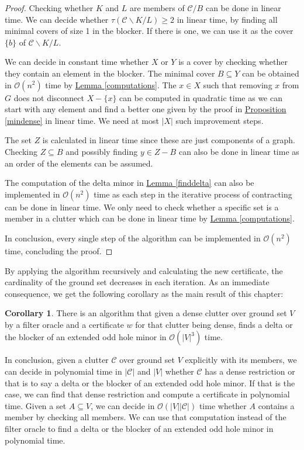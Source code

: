 \documentclass[a4paper, 12pt, twoside=false]{scrbook}
\theoremstyle{definition}
\newtheorem{corollary}[theorem]{Corollary}
\begin{document}
\begin{proof}
       Checking whether $K$ and $L$ are members of $\mathcal{C}/B$ can be done in linear time.
       We can decide whether $\tau(\mathcal{C}\backslash K / L)\geq 2$ in linear time, by finding all minimal covers of size 1 in the blocker. If there is one, we can use it as the cover $\{b\}$ of $\mathcal{C}\backslash K / L$.

       We can decide in constant time whether $X$ or $Y$ is a cover by checking whether they contain an element in the blocker.
       The minimal cover $B \subseteq Y$ can be obtained in $\mathcal{O}(n^2)$ time by \hyperref[computations]{Lemma \ref*{computations}}.
       The $x \in X$ such that removing $x$ from $G$ does not disconnect $X - \{x\}$ can be computed in quadratic time as we can start with any element and find a better one given by the proof in \hyperref[mindense]{Proposition \ref*{mindense}} in linear time. We need at most $|X|$ such improvement steps.

       The set $Z$ is calculated in linear time since these are just components of a graph.
       Checking $Z \subseteq B$ and possibly finding $y \in Z-B$ can also be done in linear time as an order of the elements can be assumed.

       The computation of the delta minor in \hyperref[finddelta]{Lemma \ref*{finddelta}} can also be implemented in $\mathcal{O}(n^2)$ time as each step in the iterative process of contracting can be done in linear time. We only need to check whether a specific set is a member in a clutter which can be done in linear time by \hyperref[computations]{Lemma \ref*{computations}}.

       In conclusion, every single step of the algorithm can be implemented in $\mathcal{O}(n^2)$ time, concluding the proof.
   \end{proof}

   By applying the algorithm recursively and calculating the new certificate, the cardinality of the ground set decreases in each iteration. As an immediate consequence, we get the following corollary as the main result of this chapter:

   \begin{corollary}
       There is an algorithm that given a dense clutter over ground set $V$ by a filter oracle and a certificate $w$ for that clutter being dense, finds a delta or the blocker of an extended odd hole minor in $\mathcal{O}(|V|^3)$ time.
   \end{corollary}

   In conclusion, given a clutter $\mathcal{C}$ over ground set $V$ explicitly with its members, we can decide in polynomial time in $|\mathcal{C}|$ and $|V|$ whether $\mathcal{C}$ has a dense restriction or that is to say a delta or the blocker of an extended odd hole minor.
   If that is the case, we can find that dense restriction and compute a certificate in polynomial time.
   Given a set $A \subseteq V$, we can decide in $\mathcal{O}(|V||\mathcal{C}|)$ time whether $A$ contains a member by checking all members. We can use that computation instead of the filter oracle to find a delta or the blocker of an extended odd hole minor in polynomial time.

   \printbibliography[title={References}]
\end{document}

